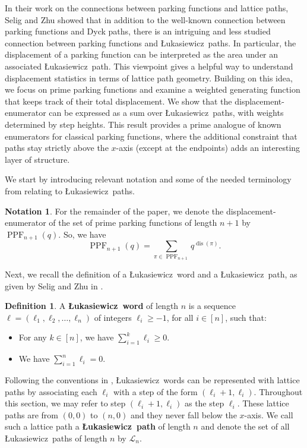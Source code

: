 \documentclass[12pt,reqno]{amsart}
\theoremstyle{definition}
\newtheorem{definition}{Definition}
\newtheorem{notation}{Notation}
\theoremstyle{remark}
\DeclareMathOperator{\PPF}{PPF}
\DeclareMathOperator{\disp}{dis} %
\newcommand{\Luka}{\L ukasiewicz}
\newcommand{\LP}{\mathcal{L}}
\newcommand{\defterm}{\textbf}
\begin{document}
In their work on the connections between parking functions and lattice paths, Selig and Zhu \cite{SZ} showed that in addition to the well-known connection between parking functions and Dyck paths, there is an intriguing and less studied connection between parking functions and \Luka~paths. In particular, the displacement of a parking function can be interpreted as the area under an associated \Luka~path. This viewpoint gives a helpful way to understand displacement statistics in terms of lattice path geometry.  Building on this idea, we focus on prime parking functions and examine a weighted generating function that keeps track of their total displacement. 
We show that the displacement-enumerator can be expressed as a sum over \Luka~paths, with weights determined by step heights. This result provides a prime analogue of known enumerators for classical parking functions, where the additional constraint that paths stay strictly above the \(x\)-axis (except at the endpoints) adds an interesting layer of structure.

We start by introducing relevant notation and some of the needed terminology from \cite{SZ} relating to \Luka~paths.

\begin{notation}
For the remainder of the paper, we denote the displacement-enumerator of the set of prime parking functions of length $n+1$ by $\PPF_{n+1}(q)$. So, we have
 \[\PPF_{n+1}(q)= \sum_{\pi \in \PPF_{n+1}} q^{\disp(\pi)}.\]
\end{notation}

Next, we recall the definition of a \Luka~word and a \Luka~path, as given by Selig and Zhu in  \cite[Definition 1.3]{SZ}. 


\begin{definition}\label{def:luk_word}
A \defterm{\Luka~{word}} of length $n$ is a sequence $\ell = (\ell_1,\ell_2, \ldots, \ell_n)$ of integers $\ell_i \geq -1$, for all $i\in[n]$, such that:
\begin{itemize}[topsep=2pt, noitemsep]
\item For any $k \in [n]$, we have $\sum\limits_{i=1}^k \ell_i \geq 0$.
\item We have $\sum\limits_{i=1}^n \ell_i = 0$.
\end{itemize}
\end{definition}


Following the conventions in \cite{SZ}, 
 \Luka~words can be represented with  lattice paths by associating each $\ell_i$ with a step of the form $(\ell_i+1,\ell_i)$. Throughout this section, we may refer to step  $(\ell_i+1,\ell_i)$ as the step $\ell_i$. 
These  lattice paths are from $(0,0)$ to $(n,0)$ and they never fall below the $x$-axis. We call such a lattice path  a \defterm{\Luka~path} of length $n$ and  denote the set of all \Luka~paths of length $n$ by $\LP_n$.
\end{document}
